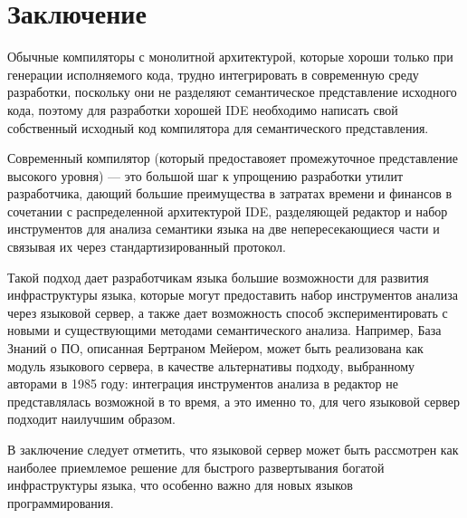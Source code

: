\section{Заключение}
\label{sec:review_conclusion}
Обычные компиляторы с монолитной архитектурой, которые хороши только при генерации исполняемого кода, 
трудно интегрировать в современную среду разработки, поскольку они не разделяют семантическое представление исходного кода, 
поэтому для разработки хорошей IDE необходимо написать свой собственный исходный код компилятора для семантического представления.

Современный компилятор (который предоставояет промежуточное представление высокого уровня) --- это большой шаг к упрощению разработки утилит разработчика, 
дающий большие преимущества в затратах времени и финансов в сочетании с распределенной архитектурой IDE, разделяющей редактор и набор инструментов для анализа семантики языка 
на две непересекающиеся части и связывая их через стандартизированный протокол.

Такой подход дает разработчикам языка большие возможности для развития инфраструктуры языка,
которые могут предоставить набор инструментов анализа через языковой сервер, 
а также дает возможность способ экспериментировать с новыми и существующими методами семантического анализа.
Например, База Знаний о ПО\cite{Wanghong}, описанная Бертраном Мейером, может быть реализована как модуль языкового сервера,
в качестве альтернативы подходу, выбранному авторами в 1985 году: интеграция инструментов анализа в редактор не представлялась возможной в то время, 
а это именно то, для чего языковой сервер подходит наилучшим образом.

В заключение следует отметить, что языковой сервер может быть рассмотрен как наиболее приемлемое решение для быстрого развертывания богатой инфраструктуры языка,
что особенно важно для новых языков программирования.